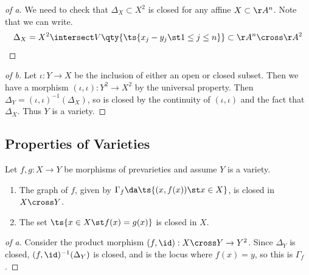 \begin{proof}[of a]

We need to check that \(\Delta_X \subset X^2\) is closed for any affine
\(X\subset \AA^n\). Note that we can write.
\begin{align*}
\Delta_X = X^2 \intersect V\qty{ \ts{x_j - y_j \st 1\leq j \leq n}} \subset \AA^n \cross \AA^2
\end{align*}

\end{proof}

\begin{proof}[of b]

Let \(\iota:Y\to X\) be the inclusion of either an open or closed
subset. Then we have a morphism \((\iota, \iota): Y^2 \to X^2\) by the
universal property. Then \(\Delta_Y = (\iota, \iota)^{-1} (\Delta_X)\),
so is closed by the continuity of \((\iota, \iota)\) and the fact that
\(\Delta_X\). Thus \(Y\) is a variety.

\end{proof}

\hypertarget{properties-of-varieties}{%
\subsection{Properties of Varieties}\label{properties-of-varieties}}

\begin{proposition}

Let \(f, g: X\to Y\) be morphisms of prevarieties and assume \(Y\) is a
variety.

\begin{enumerate}
\def\labelenumi{\alph{enumi}.}
\item
  The graph of \(f\), given by
  \(\Gamma_f \da \ts{(x, f(x)) \st x\in X}\), is closed in
  \(X\cross Y\).
\item
  The set \(\ts{x\in X\st f(x) = g(x)}\) is closed in \(X\).
\end{enumerate}

\end{proposition}

\begin{proof}[of a]

Consider the product morphism \((f, \id): X\cross Y \to Y^2\). Since
\(\Delta_Y\) is closed, \((f, \id)^{-1} (\Delta_Y)\) is closed, and is
the locus where \(f(x) = y\), so this is \(\Gamma_f\).

\end{proof}


